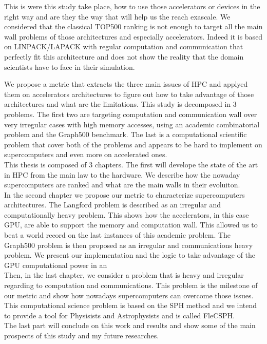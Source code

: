 This is were this study take place, how to use those accelerators or devices in the right way and are they the way that will help us the reach exascale.
We considered that the classical TOP500 ranking is not enough to target all the main wall problems of those architectures and especially accelerators. 
Indeed it is based on LINPACK/LAPACK with regular computation and communication that perfectly fit this architecture and does not show the reality that the domain scientists have to face in their simulation. 

We propose a metric that extracts the three main issues of HPC and applyed them on accelerators architectures to figure out how to take advantage of those architectures and what are the limitations. 
This study is decomposed in 3 problems. The first two are targeting computation and communication wall over very irregular cases with high memory accesses, using an academic combinatorial problem and the Graph500 benchmark. 
The last is a computational scientific problem that cover both of the problems and appears to be hard to implement on supercomputers and even more on accelerated ones.\\

This thesis is composed of 3 chapters. 
The first will develope the state of the art in HPC from the main law to the hardware. 
We describe how the nowaday supercomputers are ranked and what are the main walls in their evoluiton. \\

In the second chapter we propose our metric to characterize supercomputers architectures. 
The Langford problem is described as an irregular and computationally heavy problem.
This shows how the accelerators, in this case GPU, are able to support the memory and computation wall. 
This allowed us to beat a world record on the last instances of this academic problem.
The Graph500 problem is then proposed as an irregular and communications heavy problem. 
We present our implementation and the logic to take advantage of the GPU computational power in an \\

Then, in the last chapter, we consider a problem that is heavy and irregular regarding to computation and communications.
This problem is the milestone of our metric and show how nowadays supercomputers can overcome those issues. 
This computational science problem is based on the SPH method and we intend to provide a tool for Physisists and Astrophysists and is called FleCSPH. \\

The last part will conclude on this work and results and show some of the main prospects of this study and my future researches. 